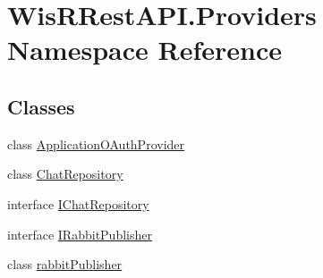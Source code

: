 \hypertarget{namespace_wis_r_rest_a_p_i_1_1_providers}{}\section{Wis\+R\+Rest\+A\+P\+I.\+Providers Namespace Reference}
\label{namespace_wis_r_rest_a_p_i_1_1_providers}
\subsection*{Classes}
\begin{DoxyCompactItemize}
\item 
class \hyperlink{class_wis_r_rest_a_p_i_1_1_providers_1_1_application_o_auth_provider}{Application\+O\+Auth\+Provider}
\item 
class \hyperlink{class_wis_r_rest_a_p_i_1_1_providers_1_1_chat_repository}{Chat\+Repository}
\item 
interface \hyperlink{interface_wis_r_rest_a_p_i_1_1_providers_1_1_i_chat_repository}{I\+Chat\+Repository}
\item 
interface \hyperlink{interface_wis_r_rest_a_p_i_1_1_providers_1_1_i_rabbit_publisher}{I\+Rabbit\+Publisher}
\item 
class \hyperlink{class_wis_r_rest_a_p_i_1_1_providers_1_1rabbit_publisher}{rabbit\+Publisher}
\end{DoxyCompactItemize}

